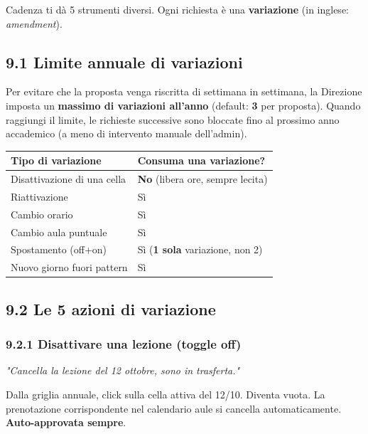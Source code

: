 \documentclass[11pt,a4paper]{article}
\renewenvironment{quote}
  {\begin{list}{}{%
      \setlength{\leftmargin}{8pt}%
      \setlength{\rightmargin}{8pt}%
      \setlength{\topsep}{6pt}%
      \setlength{\parsep}{0pt}}%
      \item\relax\color{black!75}\itshape}
  {\end{list}}
\begin{document}
Cadenza ti dà 5 strumenti diversi. Ogni richiesta è una \textbf{variazione} (in inglese: \textit{amendment}).

\subsection{9.1 Limite annuale di variazioni}


Per evitare che la proposta venga riscritta di settimana in settimana, la Direzione imposta un \textbf{massimo di variazioni all'anno} (default: \textbf{3} per proposta). Quando raggiungi il limite, le richieste successive sono bloccate fino al prossimo anno accademico (a meno di intervento manuale dell'admin).

\begin{table}[H]
\centering
\small
\begin{tabularx}{\linewidth}{|X|X|}
\hline
\rowcolor{tableheader} Tipo di variazione & Consuma una variazione? \\
\hline
Disattivazione di una cella & \textbf{No} (libera ore, sempre lecita) \\
\hline
Riattivazione & Sì \\
\hline
Cambio orario & Sì \\
\hline
Cambio aula puntuale & Sì \\
\hline
Spostamento (off+on) & Sì (\textbf{1 sola} variazione, non 2) \\
\hline
Nuovo giorno fuori pattern & Sì \\
\hline
\end{tabularx}
\end{table}


\subsection{9.2 Le 5 azioni di variazione}


\subsubsection{9.2.1 Disattivare una lezione (toggle off)}


\begin{quote}
\textit{"Cancella la lezione del 12 ottobre, sono in trasferta."}
\end{quote}

Dalla griglia annuale, click sulla cella attiva del 12/10. Diventa vuota. La prenotazione corrispondente nel calendario aule si cancella automaticamente. \textbf{Auto-approvata sempre}.
\end{document}
